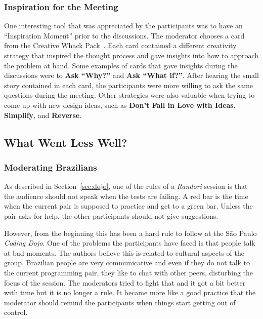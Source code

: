 \subsubsection{Inspiration for the Meeting}

One interesting tool that was appreciated by the participants was
to have an ``Inspiration Moment'' prior to the discussions. The moderator
chooses a card from the Creative Whack Pack~\cite{Creative}. Each
card contained a different creativity strategy that inspired the thought
process and gave insights into how to approach the problem at hand. Some
examples of cards that gave insights during the discussions were to
\textbf{Ask ``Why?''} and \textbf{Ask ``What if?''}. After hearing the
small story contained in each card, the participants were more willing
to ask the same questions during the meeting. Other strategies were also
valuable when trying to come up with new design ideas, such as \textbf{Don't
Fall in Love with Ideas}, \textbf{Simplify}, and \textbf{Reverse}. 

\subsection{What Went Less Well?}\label{ssub:less_well}

\subsubsection{Moderating Brazilians}

As described in Section~\ref{sec:dojo}, one of the rules of a
\emph{Randori} session is that the audience should not speak when
the tests are failing. A red bar is the time when the current
pair is supposed to practice and get to a green bar. Unless the pair
asks for help, the other participants should not give suggestions.

However, from the beginning this has been a hard rule to follow at
the São Paulo \emph{Coding Dojo}. One of the problems the participants
have faced is that people talk at bad moments. The authors
believe this is related to cultural aspects of the group. Brazilian people are
very communicative and even if they do not talk to the current programming
pair, they like to chat with other peers, disturbing the focus of the session.
The moderators tried to fight that and it got a bit better with time but it is no
longer a rule. It became more like a good practice that the moderator should
remind the participants when things start getting out of control.

